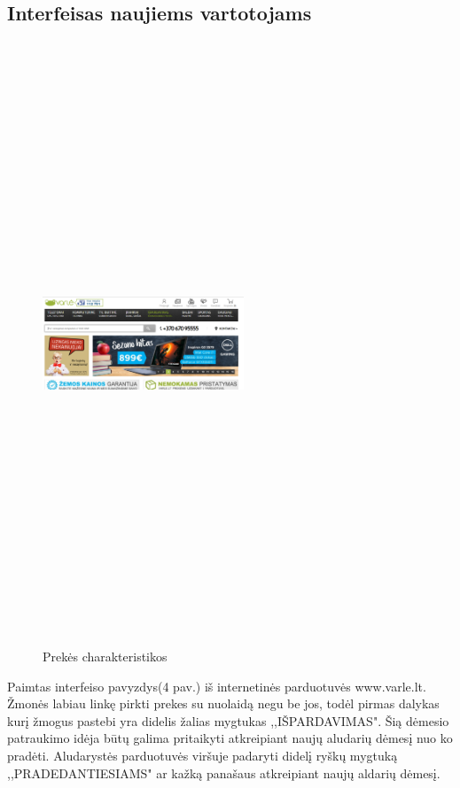 \documentclass[oneside]{VUMIFPSkursinis}
\begin{document}
	\subsection{Interfeisas naujiems vartotojams}
		\begin{figure}[h]
			\centering
			\includegraphics[width=6cm,height=18cm,keepaspectratio]{IkvepiantisInterfeisas4.png}
			\caption{ Prekės charakteristikos}
		\end{figure}
	
			Paimtas interfeiso pavyzdys(4 pav.) iš internetinės parduotuvės www.varle.lt. 
			Žmonės labiau linkę pirkti prekes su nuolaidą negu be jos, todėl pirmas dalykas kurį žmogus pastebi yra didelis žalias mygtukas ,,IŠPARDAVIMAS". 
			Šią dėmesio patraukimo idėja būtų galima pritaikyti atkreipiant naujų aludarių dėmesį nuo ko pradėti. 
			Aludarystės parduotuvės viršuje padaryti didelį ryškų mygtuką ,,PRADEDANTIESIAMS" ar kažką panašaus atkreipiant naujų aldarių dėmesį.
\end{document}
